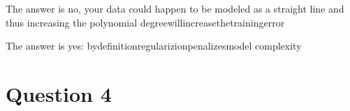 \documentclass{article}
\begin{document}
\item The\hspace{0.5cm} answer\hspace{0.5cm} is \hspace{0.5cm}no\hspace{0.5cm},\hspace{0.5cm} your\hspace{0.5cm} data\hspace{0.5cm} could\hspace{0.5cm} happen\hspace{0.5cm} to\hspace{0.5cm} be\hspace{0.5cm} modeled\hspace{0.5cm} as\hspace{0.5cm} a\hspace{0.5cm} straight\hspace{0.5cm} line\hspace{0.5cm} and\hspace{0.5cm} thus\hspace{0.5cm} increasing\hspace{0.5cm} the\hspace{0.5cm} polynomial \hspace{0.5cm}degree\hspace{0.5cm}will\hspace{0.5cm}increase\hspace{0.5cm}the\hspace{0.5cm}training\hspace{0.5cm}error

\item \hspace{0.5cm}The\hspace{0.5cm} answer\hspace{0.5cm} is\hspace{0.5cm} yes\hspace{0.5cm}:\hspace{0.5cm}
\hspace{0.5cm}by\hspace{0.5cm}definition\hspace{0.5cm}regularizion\hspace{0.5cm}penalizes\hspace{0.5cm}model
\hspace{0.5cm}complexity

\pagebreak

\section{Question 4}\label{sec:questionfour}
\end{document}
